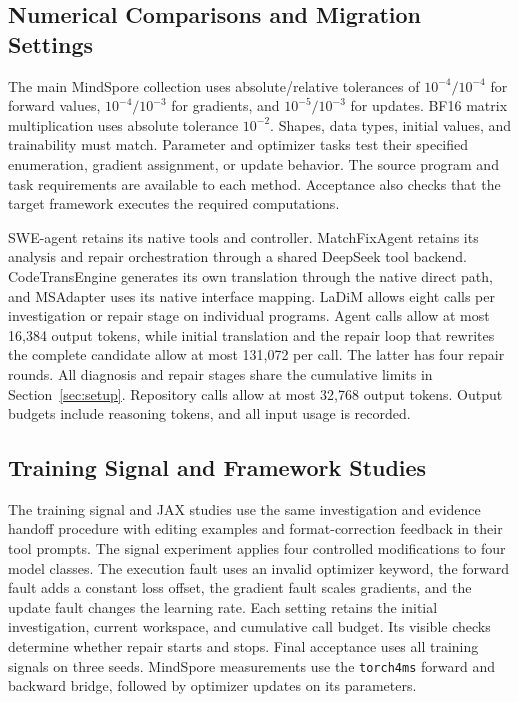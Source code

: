\subsection{Numerical Comparisons and Migration Settings}
\label{sec:migration-settings}

The main MindSpore collection uses absolute/relative tolerances of $10^{-4}/10^{-4}$ for forward values, $10^{-4}/10^{-3}$ for gradients, and $10^{-5}/10^{-3}$ for updates. BF16 matrix multiplication uses absolute tolerance $10^{-2}$. Shapes, data types, initial values, and trainability must match. Parameter and optimizer tasks test their specified enumeration, gradient assignment, or update behavior. The source program and task requirements are available to each method. Acceptance also checks that the target framework executes the required computations.

SWE-agent retains its native tools and controller. MatchFixAgent retains its analysis and repair orchestration through a shared DeepSeek tool backend. CodeTransEngine generates its own translation through the native direct path, and MSAdapter uses its native interface mapping. LaDiM allows eight calls per investigation or repair stage on individual programs. Agent calls allow at most 16,384 output tokens, while initial translation and the repair loop that rewrites the complete candidate allow at most 131,072 per call. The latter has four repair rounds. All diagnosis and repair stages share the cumulative limits in Section~\ref{sec:setup}. Repository calls allow at most 32,768 output tokens. Output budgets include reasoning tokens, and all input usage is recorded.

\subsection{Training Signal and Framework Studies}

The training signal and JAX studies use the same investigation and evidence handoff procedure with editing examples and format-correction feedback in their tool prompts. The signal experiment applies four controlled modifications to four model classes. The execution fault uses an invalid optimizer keyword, the forward fault adds a constant loss offset, the gradient fault scales gradients, and the update fault changes the learning rate. Each setting retains the initial investigation, current workspace, and cumulative call budget. Its visible checks determine whether repair starts and stops. Final acceptance uses all training signals on three seeds. MindSpore measurements use the \texttt{torch4ms} forward and backward bridge, followed by optimizer updates on its parameters.

